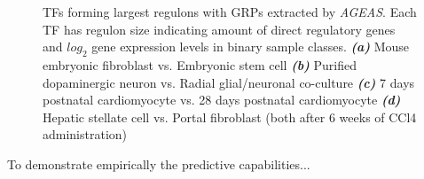 \documentclass[fleqn,10pt]{wlscirep}
\begin{document}
\begin{figure}
    \caption{
      TFs forming largest regulons with GRPs extracted by \emph{AGEAS}.
      Each TF has regulon size indicating amount of direct regulatory genes and $log_2$ gene expression levels in binary sample classes.
      \textbf{\emph{(a)}} Mouse embryonic fibroblast vs. Embryonic stem cell
      \textbf{\emph{(b)}} Purified dopaminergic neuron vs. Radial glial/neuronal co-culture
      \textbf{\emph{(c)}} 7 days postnatal cardiomyocyte vs. 28 days postnatal cardiomyocyte
      \textbf{\emph{(d)}} Hepatic stellate cell vs. Portal fibroblast (both after 6 weeks of CCl4 administration)
    }
    \label{result_figs}
  \end{figure}

  \vspace{\baselineskip}
  \noindent To demonstrate empirically the predictive capabilities...
\end{document}
